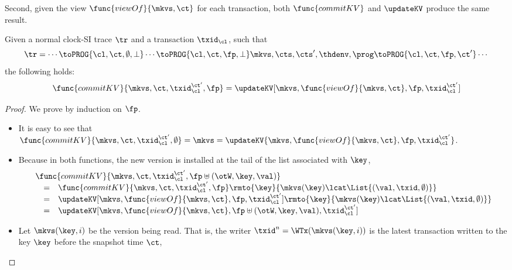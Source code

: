 Second, given the view \( \func{viewOf}{\mkvs,\ct} \) for each transaction, 
both \( \func{commitKV} \) and \( \updateKV \) produce the same result.
\begin{lemma}
    Given a normal clock-SI trace \( \tr \) and a transaction \( \txid_\cl \), such that
    \[
        \tr = \cdots \toPROG{\cl, \ct, \emptyset, \perp} \cdots \toPROG{\cl, \ct, \fp, \perp} \mkvs, \cts, \cts', \thdenv, \prog  \toPROG{\cl, \ct, \fp, \ct'} \cdots
    \] 
    the following holds:
    \[
        \func{commitKV}{\mkvs,\ct,\txid_\cl^{\ct'},\fp} = \updateKV[\mkvs, \func{viewOf}{\mkvs, \ct},\fp, \txid_\cl^{\ct'}] 
    \]
\end{lemma}
\begin{proof}
    We prove by induction on \( \fp \).
    \begin{itemize}
        \item \caseB{\( \fp = \emptyset \)}
            It is easy to see that \( \func{commitKV}{\mkvs,\ct,\txid_\cl^{\ct'},\emptyset} = \mkvs =  \updateKV{\mkvs, \func{viewOf}{\mkvs, \ct},\fp, \txid_\cl^{\ct'}} \).
        \item \caseI{\( \fp \uplus (\otW, \key, \val) \)}
            Because in both functions, the new version is installed at the tail of the list associated with \( \key \),
            \[
                \begin{array}{@{}l@{}}
                \func{commitKV}{\mkvs,\ct,\txid_\cl^{\ct'},\fp \uplus (\otW, \key, \val)}  \\
                \quad \begin{array}[t]{@{}c l@{}}
                = &
                \func{commitKV}{\mkvs,\ct,\txid_\cl^{\ct'},\fp}\rmto{\key}{\mkvs(\key) \lcat \List{(\val, \txid, \emptyset)}} \\
                = & 
                \updateKV[\mkvs,\func{viewOf}{\mkvs,\ct},\fp,\txid_\cl^{\ct'}]\rmto{\key}{\mkvs(\key) \lcat \List{(\val, \txid, \emptyset)}} \\
                = & 
                \updateKV[\mkvs,\func{viewOf}{\mkvs,\ct},\fp \uplus (\otW, \key, \val),\txid_\cl^{\ct'}]
                \end{array}
                \end{array}
            \]
        \item \caseI{\( \fp \uplus (\otR, \key, \val) \)}
            Let \( \mkvs(\key,i) \) be the version being read.
            That is, the writer \( \txid^n = \WTx(\mkvs(\key,i)) \)
            is the latest transaction written to the key \( \key \) before the snapshot time \( \ct \),

\end{itemize}
\end{proof}
